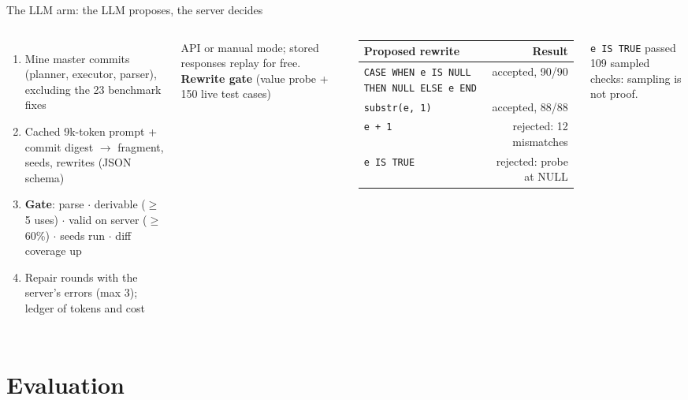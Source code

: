 \documentclass[aspectratio=169,11pt]{beamer}
\begin{document}
\begin{frame}{The LLM arm: the LLM proposes, the server decides}
\begin{columns}[T]
\footnotesize
\begin{enumerate}
  \item Mine master commits (planner, executor, parser), \alert{excluding the 23 benchmark fixes}
  \item Cached 9k-token prompt + commit digest $\rightarrow$ fragment, seeds, rewrites (JSON schema)
  \item \textbf{Gate}: parse $\cdot$ derivable ($\geq$5 uses) $\cdot$ valid on server ($\geq$60\%) $\cdot$ seeds run $\cdot$ diff coverage up
  \item Repair rounds with the server's errors (max 3); ledger of tokens and cost
\end{enumerate}
API or manual mode; stored responses replay for free.
\textbf{Rewrite gate} (value probe + 150 live test cases)
\scriptsize\setlength{\tabcolsep}{3pt}
\begin{tabularx}{\linewidth}{@{}Xr@{}}
\toprule
Proposed rewrite & Result \\
\midrule
\texttt{CASE WHEN e IS NULL THEN NULL ELSE e END} & \textcolor{good}{accepted, 90/90} \\
\texttt{substr(e, 1)} & \textcolor{good}{accepted, 88/88} \\
\texttt{e + 1} & \textcolor{warn}{rejected: 12 mismatches} \\
\texttt{e IS TRUE} & \textcolor{warn}{rejected: probe at NULL} \\
\bottomrule
\end{tabularx}

\small\medskip
\texttt{e IS TRUE} passed 109 sampled checks: \alert{sampling is not proof}.
\end{columns}
\end{frame}

\section{Evaluation}
\end{document}
